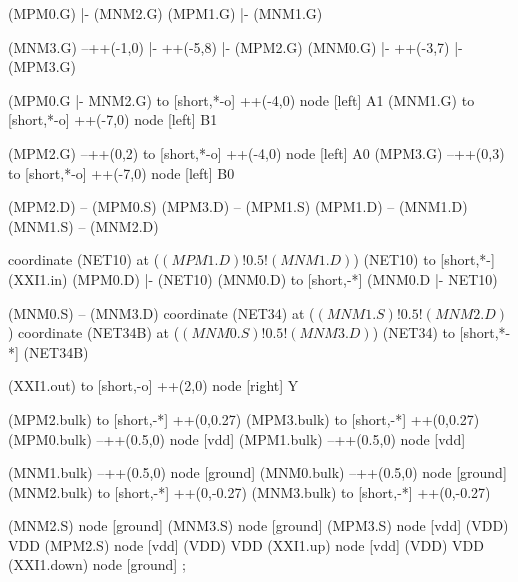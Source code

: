 \begin{circuitikz}[american]
	
	(MPM0.G) |- (MNM2.G)
	(MPM1.G) |- (MNM1.G)
	
	(MNM3.G) --++(-1,0) |- ++(-5,8) |- (MPM2.G)
	(MNM0.G) |- ++(-3,7) |- (MPM3.G)
	
	(MPM0.G |- MNM2.G) to [short,*-o] ++(-4,0) node [left] {A1}
	(MNM1.G) to [short,*-o] ++(-7,0) node [left] {B1}
	
	(MPM2.G) --++(0,2) to [short,*-o] ++(-4,0) node [left] {A0}
	(MPM3.G) --++(0,3) to [short,*-o] ++(-7,0) node [left] {B0}
	
	(MPM2.D) -- (MPM0.S)
	(MPM3.D) -- (MPM1.S)
	(MPM1.D) -- (MNM1.D)
	(MNM1.S) -- (MNM2.D)
	
	coordinate (NET10) at ($(MPM1.D)!0.5!(MNM1.D)$)
	(NET10) to [short,*-] (XXI1.in)
	(MPM0.D) |- (NET10)
	(MNM0.D) to [short,-*] (MNM0.D |- NET10)
	
	(MNM0.S) -- (MNM3.D)
	coordinate (NET34) at ($(MNM1.S)!0.5!(MNM2.D)$)
	coordinate (NET34B) at ($(MNM0.S)!0.5!(MNM3.D)$)
	(NET34) to [short,*-*] (NET34B)
	
	(XXI1.out) to [short,-o] ++(2,0) node [right] {Y}
	
	(MPM2.bulk) to [short,-*] ++(0,0.27)
	(MPM3.bulk) to [short,-*] ++(0,0.27)	
	(MPM0.bulk) --++(0.5,0) node [vdd]{}
	(MPM1.bulk) --++(0.5,0) node [vdd]{}
	
	(MNM1.bulk) --++(0.5,0) node [ground]{}
	(MNM0.bulk) --++(0.5,0) node [ground]{}
	(MNM2.bulk) to [short,-*] ++(0,-0.27)
	(MNM3.bulk) to [short,-*] ++(0,-0.27)


	(MNM2.S) node [ground] {}
	(MNM3.S) node [ground] {}
	(MPM3.S) node [vdd] (VDD) {VDD}
	(MPM2.S) node [vdd] (VDD) {VDD}
	(XXI1.up) node [vdd] (VDD) {VDD}
	(XXI1.down) node [ground] {}
;

\end{circuitikz}
